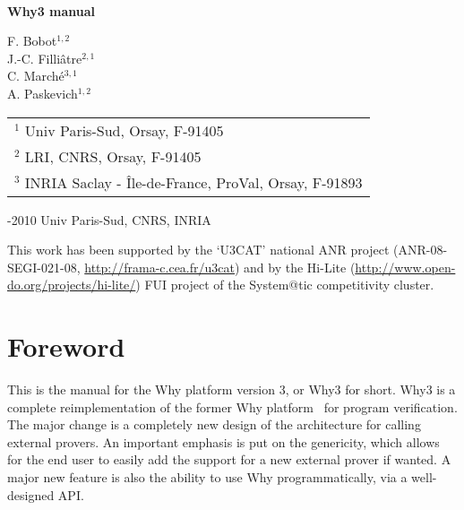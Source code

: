 \documentclass[a4paper,11pt,twoside,openright]{memoir}
\begin{document}
\sloppy
{}

\thispagestyle{empty}

\begin{center}

~

\vfill

{\Huge\bfseries Why3 manual}

\vfill

{\Large F. Bobot$^{1,2}$ \\
J.-C. Filli\^atre$^{2,1}$  \\
C. March\'e$^{3,1}$ \\
A. Paskevich$^{1,2}$}

\vfill

\begin{tabular}{l}
$^1$ Univ Paris-Sud, Orsay, F-91405 \\
$^2$ LRI, CNRS, Orsay, F-91405 \\
$^3$ INRIA Saclay - \^Ile-de-France, ProVal, Orsay, F-91893
\end{tabular}

\vfill

\begin{flushleft}
  -2010 Univ Paris-Sud, CNRS, INRIA

  This work has been supported by the `U3CAT' national ANR project
  (ANR-08-SEGI-021-08, \url{http://frama-c.cea.fr/u3cat}) and by the
  Hi-Lite (\url{http://www.open-do.org/projects/hi-lite/}) FUI project of the
  System@tic competitivity cluster.

\end{flushleft}
\end{center}

\cleardoublepage

\tableofcontents

\chapter*{Foreword}

This is the manual for the Why platform version 3, or Why3 for
short. Why3 is a complete reimplementation of the former Why
platform~\cite{filliatre07cav} for program verification.  The major
change is a completely new design of the architecture for calling
external provers. An important emphasis is put on the genericity,
which allows for the end user to easily add the support for a new
external prover if wanted.  A major new feature is also the ability
to use Why programmatically, via a well-designed API.
\end{document}

